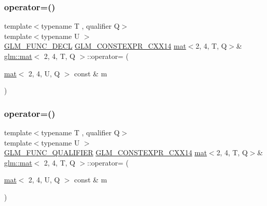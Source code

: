 \subsubsection{\texorpdfstring{operator=()}{operator=()}\hspace{0.1cm}{\footnotesize\ttfamily [2/3]}}
{\footnotesize\ttfamily template$<$typename T , qualifier Q$>$ \\
template$<$typename U $>$ \\
\hyperlink{setup_8hpp_ab2d052de21a70539923e9bcbf6e83a51}{G\+L\+M\+\_\+\+F\+U\+N\+C\+\_\+\+D\+E\+CL} \hyperlink{setup_8hpp_a4dd12abf5e1164bc57f3a34671d03844}{G\+L\+M\+\_\+\+C\+O\+N\+S\+T\+E\+X\+P\+R\+\_\+\+C\+X\+X14} \hyperlink{structglm_1_1mat}{mat}$<$2, 4, T, Q$>$\& \hyperlink{structglm_1_1mat}{glm\+::mat}$<$ 2, 4, T, Q $>$\+::operator= (\begin{DoxyParamCaption}\item[{\hyperlink{structglm_1_1mat}{mat}$<$ 2, 4, U, Q $>$ const \&}]{m }\end{DoxyParamCaption})}

\mbox{\label{structglm_1_1mat_3_012_00_014_00_01_t_00_01_q_01_4_a19be71908044d2aa85169d495b738c8f}} 
\subsubsection{\texorpdfstring{operator=()}{operator=()}\hspace{0.1cm}{\footnotesize\ttfamily [3/3]}}
{\footnotesize\ttfamily template$<$typename T , qualifier Q$>$ \\
template$<$typename U $>$ \\
\hyperlink{setup_8hpp_a33fdea6f91c5f834105f7415e2a64407}{G\+L\+M\+\_\+\+F\+U\+N\+C\+\_\+\+Q\+U\+A\+L\+I\+F\+I\+ER} \hyperlink{setup_8hpp_a4dd12abf5e1164bc57f3a34671d03844}{G\+L\+M\+\_\+\+C\+O\+N\+S\+T\+E\+X\+P\+R\+\_\+\+C\+X\+X14} \hyperlink{structglm_1_1mat}{mat}$<$2, 4, T, Q$>$\& \hyperlink{structglm_1_1mat}{glm\+::mat}$<$ 2, 4, T, Q $>$\+::operator= (\begin{DoxyParamCaption}\item[{\hyperlink{structglm_1_1mat}{mat}$<$ 2, 4, U, Q $>$ const \&}]{m }\end{DoxyParamCaption})}



